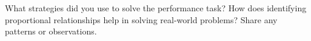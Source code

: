 \documentclass[12pt]{article}
\begin{document}
\vspace{1em}
\begin{tcolorbox}[colframe=black!60, colback=white, 
coltitle=black, colbacktitle=black!15, fonttitle=\bfseries\Large, 
title=Reflection, halign title=center, left=10pt, right=10pt, top=10pt, bottom=110pt]
What strategies did you use to solve the performance task? How does identifying proportional relationships help in solving real-world problems? Share any patterns or observations.
\end{tcolorbox}
\end{document}
